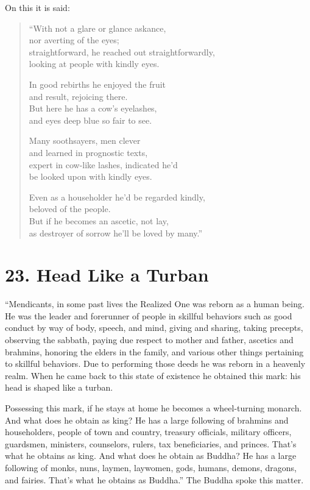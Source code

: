 \documentclass[12pt,openany]{book}%
\begin{document}
On this it is said: 

\begin{verse}%
“With not a glare or glance askance, \\
nor averting of the eyes; \\
straightforward, he reached out straightforwardly, \\
looking at people with kindly eyes. 

In good rebirths he enjoyed the fruit \\
and result, rejoicing there. \\
But here he has a cow’s eyelashes, \\
and eyes deep blue so fair to see. 

Many soothsayers, men clever \\
and learned in prognostic texts, \\
expert in cow-like lashes, indicated he’d \\
be looked upon with kindly eyes. 

Even as a householder he’d be regarded kindly, \\
beloved of the people. \\
But if he becomes an ascetic, not lay, \\
as destroyer of sorrow he’ll be loved by many.” 

%
\end{verse}

\section*{23. Head Like a Turban }

“Mendicants, in some past lives the Realized One was reborn as a human being. He was the leader and forerunner of people in skillful behaviors such as good conduct by way of body, speech, and mind, giving and sharing, taking precepts, observing the sabbath, paying due respect to mother and father, ascetics and brahmins, honoring the elders in the family, and various other things pertaining to skillful behaviors. Due to performing those deeds he was reborn in a heavenly realm. When he came back to this state of existence he obtained this mark: his head is shaped like a turban. 

Possessing this mark, if he stays at home he becomes a wheel-turning monarch. And what does he obtain as king? He has a large following of brahmins and householders, people of town and country, treasury officials, military officers, guardsmen, ministers, counselors, rulers, tax beneficiaries, and princes. That’s what he obtains as king. And what does he obtain as Buddha? He has a large following of monks, nuns, laymen, laywomen, gods, humans, demons, dragons, and fairies. That’s what he obtains as Buddha.” The Buddha spoke this matter. 
\end{document}

